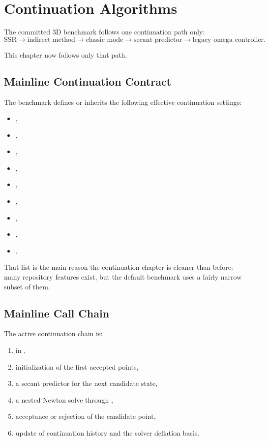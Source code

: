 \chapter{Continuation Algorithms}

The committed 3D benchmark follows one continuation path only:
\[
\text{SSR} \rightarrow \text{indirect method} \rightarrow \text{classic mode}
\rightarrow \text{secant predictor} \rightarrow \text{legacy omega controller}.
\]

This chapter now follows only that path.

\section{Mainline Continuation Contract}

The benchmark defines or inherits the following effective continuation settings:
\begin{itemize}
\item {},
\item {},
\item {},
\item {},
\item {},
\item {},
\item {},
\item {},
\item {}.
\end{itemize}

That list is the main reason the continuation chapter is cleaner than before:
many repository features exist, but the default benchmark uses a fairly narrow
subset of them.

\section{Mainline Call Chain}

The active continuation chain is:
\begin{enumerate}
\item {} in
,
\item initialization of the first accepted points,
\item a secant predictor for the next candidate state,
\item a nested Newton solve through ,
\item acceptance or rejection of the candidate point,
\item update of continuation history and the solver deflation basis.
\end{enumerate}

